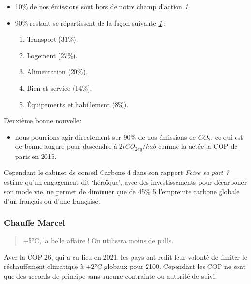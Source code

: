 \begin{itemize}
\tightlist
\item
  10\% de nos émissions sont hors de notre champ d'action
  \emph{\href{https://bonpote.com/les-infographies-bon-pote/}{1}}
\item
  90\% restant se répartissent de la façon suivante
  \emph{\href{https://bonpote.com/les-infographies-bon-pote/}{1}} :

  \begin{enumerate}
  \def\labelenumi{\arabic{enumi}.}
  \tightlist
  \item
    Transport (31\%).
  \item
    Logement (27\%).
  \item
    Alimentation (20\%).
  \item
    Bien et service (14\%).
  \item
    Équipements et habillement (8\%).
  \end{enumerate}
\end{itemize}

Deuxième bonne nouvelle:

\begin{itemize}
\tightlist
\item
  nous pourrions agir directement sur 90\% de nos émissions de \(CO_2\),
  ce qui est de bonne augure pour descendre à \(2 tCO_{2eq}/hab\) comme
  la actée la COP de paris en 2015.
\end{itemize}

Cependant le cabinet de conseil Carbone 4 dans son rapport \emph{Faire
sa part ?} estime qu'un engagement dit `héroïque', avec des
investissements pour décarboner son mode vie, ne permet de diminuer que
de 45\% \href{https://www.carbone4.com/publication-faire-sa-part}{5}
l'empreinte carbone globale d'un français ou d'une française.

\hypertarget{chauffe-marcel}{%
\subsubsection{Chauffe Marcel}\label{chauffe-marcel}}

\begin{quote}
+5°C, la belle affaire ! On utilisera moins de pulls.
\end{quote}

Avec la COP 26, qui a eu lieu en 2021, les pays ont redit leur volonté
de limiter le réchauffement climatique à +2°C globaux pour 2100.
Cependant les COP ne sont que des accords de principe sans aucune
contrainte ou autorité de suivi.

